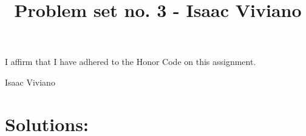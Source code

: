 \documentclass[12pt, reqno]{amsart}
\theoremstyle{definition}
\theoremstyle{remark}
\begin{document}
\title[Math 357 - Harmonic Analysis]{Problem set no. 3 - Isaac Viviano}

\begin{titlepage}
   \maketitle

   I affirm that I have adhered to the Honor Code on this assignment. 
   \begin{flushright} Isaac Viviano \end{flushright}
\end{titlepage}

\section*{}

\section{Solutions:} 
\end{document}
